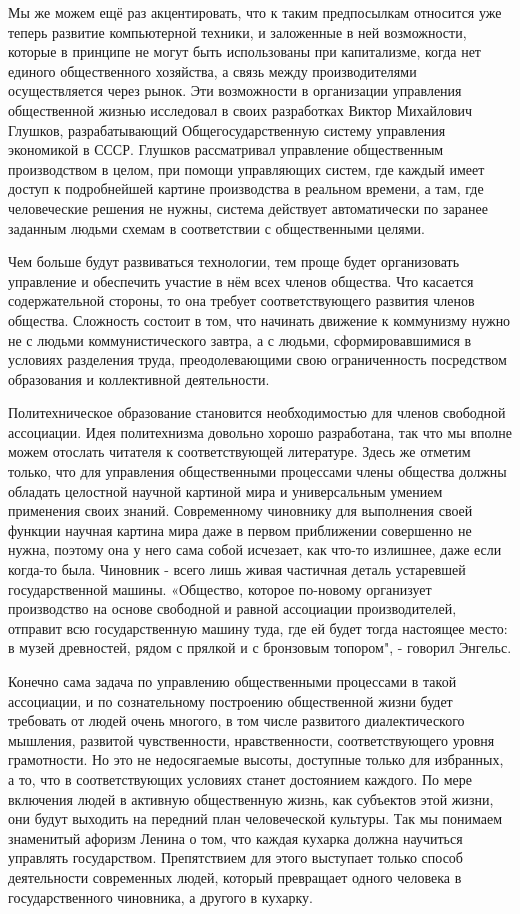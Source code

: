 \documentclass[12pt,a4paper,openany]{book}
\begin{document}
Мы же можем ещё раз акцентировать, что к таким предпосылкам относится уже теперь развитие компьютерной техники, и заложенные в ней возможности, которые в принципе не могут быть использованы при капитализме, когда нет единого общественного хозяйства, а связь между производителями осуществляется через рынок. Эти возможности в организации управления общественной жизнью исследовал в своих разработках Виктор Михайлович Глушков, разрабатывающий Общегосударственную систему управления экономикой в СССР. Глушков рассматривал управление общественным производством в целом, при помощи управляющих систем, где каждый имеет доступ к подробнейшей картине производства в реальном времени, а там, где человеческие решения не нужны, система действует автоматически по заранее заданным людьми схемам в соответствии с общественными целями.

Чем больше будут развиваться технологии, тем проще будет организовать управление и обеспечить участие в нём всех членов общества. Что касается содержательной стороны, то она требует соответствующего развития членов общества. Сложность состоит в том, что начинать движение к коммунизму нужно не с людьми коммунистического завтра, а с людьми, сформировавшимися в условиях разделения труда, преодолевающими свою ограниченность посредством образования и коллективной деятельности.

Политехническое образование становится необходимостью для членов свободной ассоциации. Идея политехнизма довольно хорошо разработана, так что мы вполне можем отослать читателя к соответствующей литературе. Здесь же отметим только, что для управления общественными процессами члены общества должны обладать целостной научной картиной мира и универсальным умением применения своих знаний. Современному чиновнику для выполнения своей функции научная картина мира даже в первом приближении совершенно не нужна, поэтому она у него сама собой исчезает, как что-то излишнее, даже если когда-то была. Чиновник - всего лишь живая частичная деталь устаревшей государственной машины. «Общество, которое по-новому организует производство на основе свободной и равной ассоциации производителей, отправит всю государственную машину туда, где ей будет тогда настоящее место: в музей древностей, рядом с прялкой и с бронзовым топором", - говорил Энгельс.

Конечно сама задача по управлению общественными процессами в такой ассоциации, и по сознательному построению общественной жизни будет требовать от людей очень многого, в том числе развитого диалектического мышления, развитой чувственности, нравственности, соответствующего уровня грамотности. Но это не недосягаемые высоты, доступные только для избранных, а то, что в соответствующих условиях станет достоянием каждого. По мере включения людей в активную общественную жизнь, как субъектов этой жизни, они будут выходить на передний план человеческой культуры. Так мы понимаем знаменитый афоризм Ленина о том, что каждая кухарка должна научиться управлять государством. Препятствием для этого выступает только способ деятельности современных людей, который превращает одного человека в государственного чиновника, а другого в кухарку.
\end{document}
